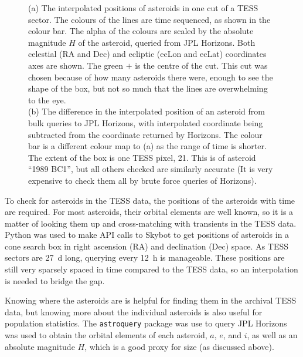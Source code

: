 \documentclass{UCreport}
\begin{document}
\begin{figure}[h!]
  \caption[Interpolated positions and error of asteroids]{
    (a)
    The interpolated positions of asteroids in one cut of a TESS sector.
    The colours of the lines are time sequenced, as shown in the colour bar.
    The alpha of the colours are scaled by the absolute magnitude $H$ of the asteroid, queried from JPL Horizons.
    Both celestial (RA and Dec) and ecliptic (ecLon and ecLat) coordinates axes are shown.
    The green $+$ is the centre of the cut.
    This cut was chosen because of how many asteroids there were, enough to see the shape of the box, but not so much that the lines are overwhelming to the eye.\\
    (b)
    The difference in the interpolated position of an asteroid from bulk queries to JPL Horizons, with interpolated coordinate being subtracted from the coordinate returned by Horizons. The colour bar is a different colour map to (a) as the range of time is shorter. The extent of the box is one TESS pixel, \qty{21}{\arcsec}. This is of asteroid ``1989 BC1'', but all others checked are similarly accurate (It is very expensive to check them all by brute force queries of Horizons).
  }
  \label{Fig:interpandErrPos}
\end{figure}

To check for asteroids in the TESS data, the positions of the asteroids with time are required.
For most asteroids, their orbital elements are well known, so it is a matter of looking them up and cross-matching with transients in the TESS data.
Python was used to make API calls to
Skybot \citep{Berthier2006} to get positions of asteroids in a cone search box in right ascension (RA) and  declination (Dec) space.
As TESS sectors are \qty{27}{\day} long, querying every \qty{12}{\hour} is manageable.
These positions are still very sparsely spaced in time compared to the TESS data, so an interpolation is needed to bridge the gap.

Knowing where the asteroids are is helpful for finding them in the archival TESS data, but knowing more about the individual asteroids is also useful for population statistics.
The \texttt{astroquery} \citep{Ginsburg2019} package was use to query JPL Horizons%
was used to obtain the orbital elements of each asteroid, $a$, $e$, and $i$, as well as an absolute magnitude $H$, which is a good proxy for size (as discussed above). %
\end{document}

